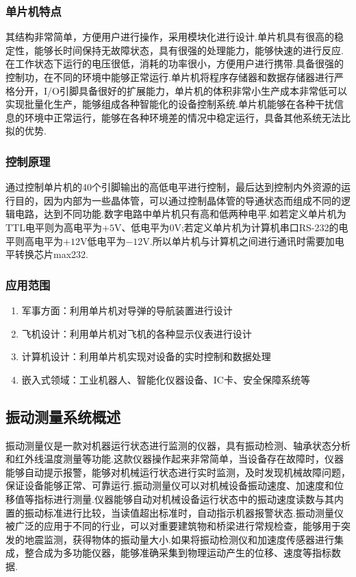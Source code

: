 \documentclass[12pt,a4paper,citestyle=gb7714-2015, bibstyle=gb7714-2015,bibtex]{HDUPaper}
\begin{document}
\subsubsection*{单片机特点}
其结构非常简单，方便用户进行操作，采用模块化进行设计.单片机具有很高的稳定性，能够长时间保持无故障状态，具有很强的处理能力，能够快速的进行反应.在工作状态下运行的电压很低，消耗的功率很小，方便用户进行携带.具备很强的控制功，在不同的环境中能够正常运行.单片机将程序存储器和数据存储器进行严格分开，I/O引脚具备很好的扩展能力，单片机的体积非常小生产成本非常低可以实现批量化生产，能够组成各种智能化的设备控制系统.单片机能够在各种干扰信息的环境中正常运行，能够在各种环境差的情况中稳定运行，具备其他系统无法比拟的优势.
\subsubsection*{控制原理}
通过控制单片机的40个引脚输出的高低电平进行控制，最后达到控制内外资源的运行目的，因为内部为一些晶体管，可以通过控制晶体管的导通状态而组成不同的逻辑电路，达到不同功能.数字电路中单片机只有高和低两种电平.如若定义单片机为TTL电平则为高电平为$+5\mathrm{V}$、低电平为$0\mathrm{V}$;若定义单片机为计算机串口RS-232的电平则高电平为$+12\mathrm{V}$低电平为$-12\mathrm{V}$.所以单片机与计算机之间进行通讯时需要加电平转换芯片max232.
\subsubsection*{应用范围}
\begin{enumerate}
  \item 军事方面：利用单片机对导弹的导航装置进行设计
  \item 飞机设计：利用单片机对飞机的各种显示仪表进行设计
  \item 计算机设计：利用单片机实现对设备的实时控制和数据处理
  \item 嵌入式领域：工业机器人、智能化仪器设备、IC卡、安全保障系统等
\end{enumerate}
\subsection{振动测量系统概述}
振动测量仪是一款对机器运行状态进行监测的仪器，具有振动检测、轴承状态分析和红外线温度测量等功能.这款仪器操作起来非常简单，当设备存在故障时，仪器能够自动提示报警，能够对机械运行状态进行实时监测，及时发现机械故障问题，保证设备能够正常、可靠运行.振动测量仪可以对机械设备振动速度、加速度和位移值等指标进行测量\cite{cn1,en1}.仪器能够自动对机械设备运行状态中的振动速度读数与其内置的振动标准进行比较，当读值超出标准时，自动指示机器报警状态.振动测量仪被广泛的应用于不同的行业，可以对重要建筑物和桥梁进行常规检查，能够用于突发的地震监测，获得物体的振动量大小.如果将振动检测仪和加速度传感器进行集成，整合成为多功能仪器，能够准确采集到物理运动产生的位移、速度等指标数据.
\end{document}
